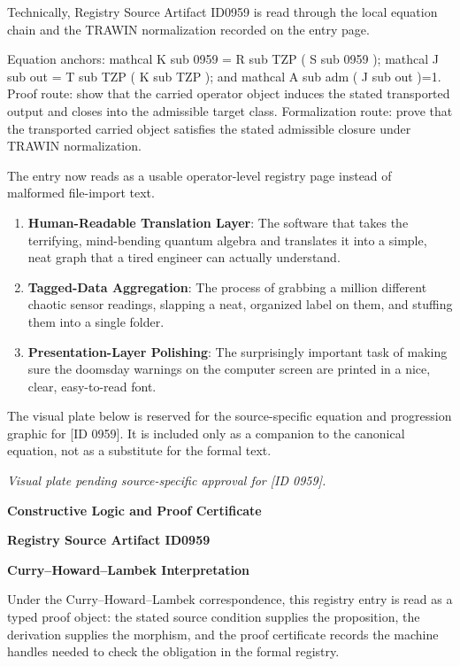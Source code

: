 Technically, Registry Source Artifact ID0959 is read through the local equation chain and the TRAWIN normalization recorded on the entry page.

Equation anchors: mathcal K sub 0959 = R sub TZP ( S sub 0959 ); mathcal J sub out = T sub TZP ( K sub TZP ); and mathcal A sub adm ( J sub out )=1. Proof route: show that the carried operator object induces the stated transported output and closes into the admissible target class. Formalization route: prove that the transported carried object satisfies the stated admissible closure under TRAWIN normalization.

The entry now reads as a usable operator-level registry page instead of malformed file-import text.
\endgroup

\begin{enumerate}[leftmargin=1.6em,itemsep=6pt,topsep=4pt]
\item \textbf{Human-Readable Translation Layer}: The software that takes the terrifying, mind-bending quantum algebra and translates it into a simple, neat graph that a tired engineer can actually understand.
\item \textbf{Tagged-Data Aggregation}: The process of grabbing a million different chaotic sensor readings, slapping a neat, organized label on them, and stuffing them into a single folder.
\item \textbf{Presentation-Layer Polishing}: The surprisingly important task of making sure the doomsday warnings on the computer screen are printed in a nice, clear, easy-to-read font.
\end{enumerate}

\begingroup\footnotesize\sloppy
The visual plate below is reserved for the source-specific equation and progression graphic for [ID 0959]. It is included only as a companion to the canonical equation, not as a substitute for the formal text.
\par\endgroup
\begingroup\footnotesize\itshape
Visual plate pending source-specific approval for [ID 0959].
\par\endgroup

\clearpage
\begingroup\tzpsupportsetup
\noindent\textbf{\fontsize{10.8pt}{12.8pt}\selectfont [ID 0959] Constructive Logic and Proof Certificate}\par
\noindent\textbf{\fontsize{10pt}{12pt}\selectfont Registry Source Artifact ID0959}\par
\vspace{0.45em}
\begingroup
\footnotesize
\setlength{\parskip}{0.22em}
\setlength{\parindent}{0pt}
\noindent\textbf{Curry--Howard--Lambek Interpretation}\par
Under the Curry--Howard--Lambek correspondence, this registry entry is read as a typed proof
object: the stated source condition supplies the proposition, the derivation supplies the
morphism, and the proof certificate records the machine handles needed to check the obligation
in the formal registry.

